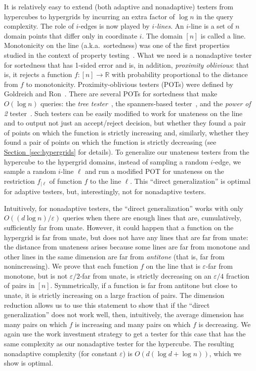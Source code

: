 \documentclass[11pt]{article}
\numberwithin{equation}{section}
\theoremstyle{definition}
\theoremstyle{plain}
\newcommand{\R}{\mathbb R}
\newcommand{\expref}[2]{\hyperref[#2]{#1~\ref{#2}}}
\newcommand{\eps}{\varepsilon}
\newcommand{\Sec}[1]{\expref{Section}{sec:#1}}
\begin{document}
It is relatively easy to extend (both adaptive and nonadaptive) testers from hypercubes to hypergrids by incurring an extra factor of $\log n$ in the query complexity. The role of $i$-edges is now played by \emph{$i$-lines}. An $i$-line is a set of $n$ domain points that differ only in coordinate $i$. The domain $[n]$ is called a line.
Monotonicity on the line (a.k.a.\ sortedness) was one of the first properties studied in the context of property testing~\cite{EKKRV00}. What we need is a nonadaptive tester for sortedness that has 1-sided error and is, in addition, \emph{proximity oblivious}: that is, it rejects a function $f:[n]\to\R$ with probability proportional to the distance from $f$ to monotonicity. Proximity-oblivious testers (POTs) were defined by Goldreich and Ron~\cite{GR11}. There are several POTs for sortedness that make $O(\log n)$ queries: the \emph{tree tester}~\cite{EKKRV00}, the spanners-based tester~\cite{BGJRW12, Ras10}, and the \emph{power of 2} tester~\cite{CS13}.
Such testers can be easily modified to work for unateness on the line and to output not just an accept/reject decision, but whether they found a pair of points on which the function is strictly increasing and, similarly, whether they found a pair of points on which the function is strictly decreasing (see \Sec{hypergrids} for details).
To generalize our unateness testers from the hypercube to the hypergrid domains, instead
of sampling a random $i$-edge, we sample a random $i$-line $\ell$ and run a modified POT for unateness on 
%
the restriction $f_{|\ell}$ of function $f$ to the line $\ell$.
This ``direct generalization'' is optimal for adaptive testers, but, interestingly, not for nonadaptive testers.

Intuitively, for nonadaptive testers, the ``direct generalization'' works with only $O(({d\log n})/\eps)$ queries when there are enough lines that are, cumulatively, sufficiently far from unate. However, it could happen that a function on the hypergrid is far from unate, but does not have any lines that are far from unate: the distance from unateness arises because some lines are far from monotone and other lines in the same dimension are far from 
%
%
\emph{antitone} %
(that is, %
far from nonincreasing).  %
%
We prove that each function $f$ on the line that is $\eps$-far from monotone, but is not $\eps/2$-far from unate, is strictly 
%
%
decreasing
on
an  %
$\eps/4$ fraction of pairs in $[n]$. Symmetrically, if a function is far from 
%
%
antitone %
but close to unate, it is strictly 
%
increasing 
%
on a large fraction of pairs. The dimension reduction allows us to use this statement to show that if the ``direct generalization'' does not work well, then, intuitively, the average dimension has many pairs on which $f$ is increasing and many pairs on which $f$ is decreasing. We again use
the %
work investment strategy to get a tester for this case that has the same complexity as our nonadaptive tester for the hypercube.
The resulting nonadaptive complexity (for constant $\eps$) is $O(d(\log d + \log n))$, which we show is optimal.
\end{document}

